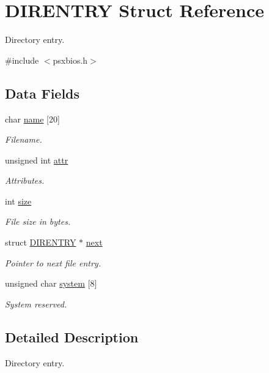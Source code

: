 \hypertarget{structDIRENTRY}{}\section{D\+I\+R\+E\+N\+T\+R\+Y Struct Reference}
\label{structDIRENTRY}


Directory entry.  




{\ttfamily \#include $<$psxbios.\+h$>$}

\subsection*{Data Fields}
\begin{DoxyCompactItemize}
\item 
char \hyperlink{structDIRENTRY_a399cf9bfdcc24e250a0276eea0ae95c0}{name} \mbox{[}20\mbox{]}
\begin{DoxyCompactList}\small\item\em Filename. \end{DoxyCompactList}\item 
unsigned int \hyperlink{structDIRENTRY_a3a69fa9a11d915150af5a10047f593da}{attr}
\begin{DoxyCompactList}\small\item\em Attributes. \end{DoxyCompactList}\item 
int \hyperlink{structDIRENTRY_a5c334817f6e1341cd2c0e69a3eea867b}{size}
\begin{DoxyCompactList}\small\item\em File size in bytes. \end{DoxyCompactList}\item 
struct \hyperlink{structDIRENTRY}{D\+I\+R\+E\+N\+T\+R\+Y} $\ast$ \hyperlink{structDIRENTRY_aa137960e22f2663b42d51cb6979f3ac3}{next}
\begin{DoxyCompactList}\small\item\em Pointer to next file entry. \end{DoxyCompactList}\item 
unsigned char \hyperlink{structDIRENTRY_af4a5a4c764708f42c4f4396705e0b461}{system} \mbox{[}8\mbox{]}
\begin{DoxyCompactList}\small\item\em System reserved. \end{DoxyCompactList}\end{DoxyCompactItemize}


\subsection{Detailed Description}
Directory entry. 

